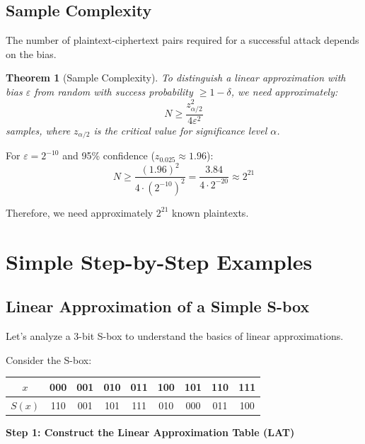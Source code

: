 \documentclass[12pt,a4paper]{article}
\newtheorem{theorem}{Theorem}[section]
\newcommand{\bias}{\varepsilon}
\begin{document}
\subsection{Sample Complexity}

The number of plaintext-ciphertext pairs required for a successful attack depends on the bias.

\begin{theorem}[Sample Complexity]
To distinguish a linear approximation with bias $\bias$ from random with success probability $\geq 1-\delta$, we need approximately:
$$N \geq \frac{z_{\alpha/2}^2}{4\bias^2}$$
samples, where $z_{\alpha/2}$ is the critical value for significance level $\alpha$.
\end{theorem}

\begin{examplebox}[title=Sample Complexity Calculation]
For $\bias = 2^{-10}$ and 95\% confidence ($z_{0.025} \approx 1.96$):
$$N \geq \frac{(1.96)^2}{4 \cdot (2^{-10})^2} = \frac{3.84}{4 \cdot 2^{-20}} \approx 2^{21}$$

Therefore, we need approximately $2^{21}$ known plaintexts.
\end{examplebox}

\section{Simple Step-by-Step Examples}

\subsection{Linear Approximation of a Simple S-box}

Let's analyze a 3-bit S-box to understand the basics of linear approximations.

\begin{examplebox}[title=3-bit S-box Example]
Consider the S-box:
\begin{center}
\begin{tabular}{c|cccccccc}
$x$ & 000 & 001 & 010 & 011 & 100 & 101 & 110 & 111 \\
\hline
$S(x)$ & 110 & 001 & 101 & 111 & 010 & 000 & 011 & 100 \\
\end{tabular}
\end{center}
\end{examplebox}

\textbf{Step 1: Construct the Linear Approximation Table (LAT)}
\end{document}
